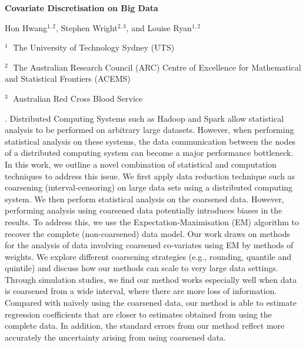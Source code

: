 \documentclass[12pt]{article}
\begin{document}
\begin{flushleft}


{\LARGE\bf Covariate Discretisation on Big Data}


\vspace{1.0cm}

Hon Hwang$^{1,2}$, Stephen Wright$^{2,3}$, and Louise Ryan$^{1,2}$ 

\begin{description}

\item $^1 \;$ The University of Technology Sydney (UTS)
\item $^2 \;$ The Australian Research Council (ARC) Centre of Excellence for Mathematical and Statistical Frontiers (ACEMS)
\item $^3 \;$ Australian Red Cross Blood Service



\end{description}

\end{flushleft}


\vspace{0.75cm}

\noindent


. Distributed Computing Systems such as Hadoop and Spark allow
statistical analysis to be performed on arbitrary large datasets. However,
when performing statistical analysis on these systems, the data communication
between the nodes of a distributed computing system can become a major performance
bottleneck. In this work, we outline a novel combination of statistical and
computation techniques to address this issue.
We first apply data reduction technique such as coarsening (interval-censoring) on
large data sets using a distributed computing system.
We then perform statistical analysis on the coarsened data.
However, performing analysis using coarsened data potentially introduces biases
in the results.
To address this, we use the Expectation-Maximisation (EM) algorithm to recover
the complete (non-coarsened) data model. Our work draws on methods for
the analysis of data involving coarsened co-variates using EM by methods
of weights. We explore different coarsening strategies (e.g., rounding, quantile
and quintile) and discuss how our methods can scale to very large data
settings. Through simulation studies, we find our method works especially
well when data is coarsened from a wide interval, where there are more
loss of information. Compared with na\"{i}vely using the coarsened data,
our method is able to estimate regression coefficients that are closer to
estimates obtained from using the complete data. In addition, the standard
errors from our method reflect more accurately the uncertainty arising from
using coarsened data.
\end{document}
